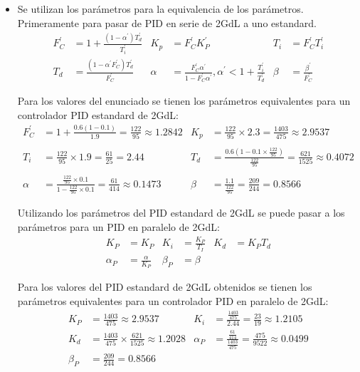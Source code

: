\begin{ejercicio}

\begin{itemize}
  \item 
  Se utilizan los parámetros para la equivalencia de los parámetros. Primeramente para pasar de PID en serie de 2GdL a uno estandard.
  \begin{align*}
    F_C^{'} &= 1 + \frac{(1-\alpha^{'})T_d^{'}}{T_i^{'}}
    &
    K_p &= F_C^{'} K_P^{'} 
    &
    T_i &= F_C^{'} T_i^{'}
    \\
    T_d &= \frac{(1-\alpha^{'} F_C^{'}) T_d^{'}}{F_C^{'}}
    &
    \alpha &= \frac{F_C^{'}  \alpha^{'}}{1-F_C^{'}  \alpha^{'}}, \alpha^{'} <1+\frac{T_i^{'}}{T_d^{'}}
    &
    \beta &= \frac{\beta^{'}}{F_C^{'}}
  \end{align*}

  Para los valores del enunciado se tienen los parámetros equivalentes para un controlador PID estandard de 2GdL:
  \begin{align*}
    F_C^{'} &= 1 + \frac{0.6(1-0.1)}{1.9} = \frac{122}{95} \approx 1.2842
    &
    K_p &= \frac{122}{95}\times 2.3 = \frac{1403}{475} \approx 2.9537
    \\\\
    T_i &= \frac{122}{95}\times 1.9 = \frac{61}{25} = 2.44
    &
    T_d &= \frac{0.6(1-0.1 \times \frac{122}{95})}{\frac{122}{95}} = \frac{621}{1525} \approx 0.4072
    \\\\
    \alpha &= \frac{\frac{122}{95} \times 0.1}{1-\frac{122}{95} \times 0.1} = \frac{61}{414} \approx 0.1473
    &
    \beta &= \frac{1.1}{\frac{122}{95}} = \frac{209}{244} = 0.8566
  \end{align*}

  Utilizando los parámetros del PID estandard de 2GdL se puede pasar a  los parámetros para un PID en paralelo de 2GdL:
  \begin{align*}
    K_P &= K_P
    &
    K_i &= \frac{K_P}{T_I}
    &
    K_d &= K_P T_d 
    \\
    \alpha_P &= \frac{\alpha}{K_P}
    &
    \beta_P &= \beta
  \end{align*}

  Para los valores del PID estandard de 2GdL obtenidos se tienen los parámetros equivalentes para un controlador PID en paralelo de 2GdL:
    \begin{align*}
    K_P &= \frac{1403}{475} \approx 2.9537
    &
    K_i &= \frac{\frac{1403}{475}}{2.44} = \frac{23}{19} \approx 1.2105
    \\
    K_d &= \frac{1403}{475} \times \frac{621}{1525} \approx 1.2028
    &
    \alpha_P &= \frac{\frac{61}{414}}{\frac{1403}{475}} =\frac{475}{9522} \approx 0.0499
    \\
    \beta_P &= \frac{209}{244} = 0.8566
  \end{align*}


\end{itemize}
\end{ejercicio}
